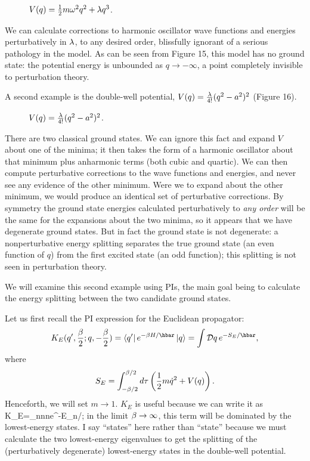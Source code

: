 \documentclass[12pt]{article}
\begin{document}
\begin{figure}[hb]
\epsfysize=5cm
\centerline{}
\caption{$V(q)={\frac 12} m{\omega}^2 q^2+\lambda q^3$.}
\end{figure}


We can calculate corrections to harmonic oscillator wave functions
and energies perturbatively in $\lambda$, to any desired
order, blissfully ignorant of a serious pathology in
the model.
As can be seen from Figure 15, this model has no ground state: the
potential energy is unbounded as $q\to-\infty$, a point completely
invisible to perturbation theory.

A second example is the double-well potential,
$V(q)={\lambda\over4!}(q^2-a^2)^2$ (Figure 16).
\begin{figure}[hb]
\epsfysize=4.5cm
\centerline{}
\caption{$V(q)={\lambda\over4!}(q^2-a^2)^2$.}
\end{figure}
There are two classical ground states. We can ignore this fact and
expand $V$ about one of the minima; it then takes the form of
a harmonic oscillator about that minimum plus anharmonic terms
(both cubic and quartic). We can then compute perturbative corrections
to the wave functions and energies, and never see any evidence of the
other minimum. Were we to expand about the other minimum, we would
produce an identical set of perturbative corrections. By symmetry the
ground state energies calculated perturbatively to {\em any order} will
be the same for the expansions about the two minima, so it appears
that we have degenerate ground states. But in fact the ground state is
not degenerate: a  nonperturbative energy splitting separates the true
ground state (an even function of $q$) from the first excited state
(an odd function); this splitting is not seen in perturbation theory.

We will examine this second example using PIs, the main goal being to
calculate the energy splitting between the two candidate ground states.

Let us first recall the PI expression for the Euclidean propagator:
\[
K_E(q',{\be\over2};q,-{\be\over2})=
\bra{q'}e^{-\be H/\hbar}\ket{q}=
\int\DD q\,e^{-S_E/\hbar},
\]
where 
\[
S_E=\int_{-{\beta}/2}^{{\beta}/2}d\tau\left({\frac 12} m{\dot q}^2+V(q)\right).
\]
Henceforth, we will set $m\to1$. $K_E$ is useful because we can write
it as
\beq
K_E=\sum_nn\rangle\langle ne^{-\be E_n/\hbar};
\label{inst1}
\eeq
in the limit ${\beta}\to\infty$, this term will be dominated by the
lowest-energy states. I say ``states'' here rather than ``state''
because we must calculate the two lowest-energy eigenvalues to get
the splitting of the (perturbatively degenerate) lowest-energy states
in the double-well potential.
\end{document}
